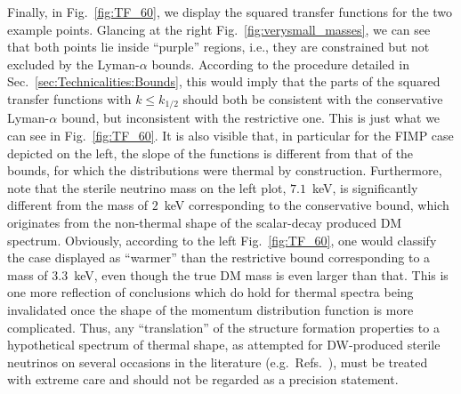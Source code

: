 Finally, in Fig.~\ref{fig:TF_60}, we display the squared transfer functions for the two example points. Glancing at the right Fig.~\ref{fig:verysmall_masses}, we can see that both points lie inside ``purple'' regions, i.e., they are constrained but not excluded by the Lyman-$\alpha$ bounds. According to the procedure detailed in Sec.~\ref{sec:Technicalities:Bounds}, this would imply that the parts of the squared transfer functions with $k \leq k_{1/2}$ should both be consistent with the conservative Lyman-$\alpha$ bound, but inconsistent with the restrictive one. This is just what we can see in Fig.~\ref{fig:TF_60}. It is also visible that, in particular for the FIMP case depicted on the left, the slope of the functions is different from that of the bounds, for which the distributions were thermal by construction. Furthermore, note that the sterile neutrino mass on the left plot, $7.1$~keV, is significantly different from the mass of $2$~keV corresponding to the conservative bound, which originates from the non-thermal shape of the scalar-decay produced DM spectrum. Obviously, according to the left Fig.~\ref{fig:TF_60}, one would classify the case displayed as ``warmer'' than the restrictive bound corresponding to a mass of $3.3$~keV, even though the true DM mass is even larger than that. This is one more reflection of conclusions which do hold for thermal spectra being invalidated once the shape of the momentum distribution function is more complicated. Thus, any ``translation'' of the structure formation properties to a hypothetical spectrum of thermal shape, as attempted for DW-produced sterile neutrinos on several occasions in the literature (e.g.\ Refs.~\cite{Colombi:1995ze,Viel:2013apy,Markovic:2013iza,Abada:2014zra,Popa:2015eta,Bozek:2015bdo,Baur:2015jsy}), must be treated with extreme care and should not be regarded as a precision statement.

